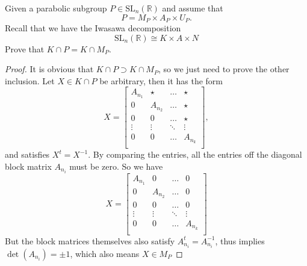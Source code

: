 \documentclass[12pt]{article} %
\begin{document}
\begin{tcolorbox}[colback=blue!5!white,colframe=blue!75!black,title=Problem 4]
  Given a parabolic subgroup $P \in \text{SL}_n(\mathbb{R})$ and assume that
  \[P = M_P \times A_P \times U_P.\]
  Recall that we have the Iwasawa decomposition
  \[ \text{SL}_n(\mathbb{R}) \cong K \times A \times N\]
  Prove that $K \cap P = K \cap M_P$.
\end{tcolorbox}
\begin{proof}
  It is obvious that $K \cap P \supset K \cap M_P$, so we just need to prove the other inclusion. Let $X \in K \cap P$
  be arbitrary, then it has the form
  \[X = \begin{bmatrix}
      A_{n_1} & \star   & \ldots & \star   \\
      0       & A_{n_2} & \ldots & \star   \\
      0       & 0       & \ldots & \star   \\
      \vdots  & \vdots  & \ddots & \vdots  \\
      0       & 0       & \ldots & A_{n_k} \\
    \end{bmatrix},\]
  and satisfies $X^t = X^{-1}$. By comparing the entries, all the entries off the diagonal block matrix $A_{n_i}$
  must be zero. So we have
  \[X = \begin{bmatrix}
      A_{n_1} & 0       & \ldots & 0       \\
      0       & A_{n_2} & \ldots & 0       \\
      0       & 0       & \ldots & 0       \\
      \vdots  & \vdots  & \ddots & \vdots  \\
      0       & 0       & \ldots & A_{n_k} \\
    \end{bmatrix}\]
  But the block matrices themselves also satisfy $A_{n_i}^t = A_{n_i}^{-1}$, thus implies
  $\det(A_{n_i}) = \pm 1$, which also means $X \in M_P$
\end{proof}
\end{document}
